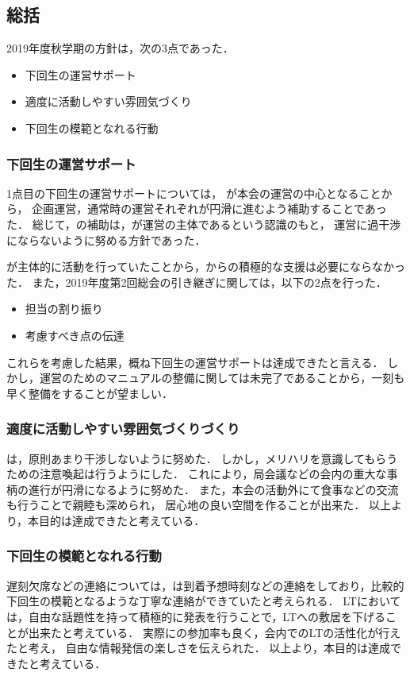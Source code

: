 \subsection*{\thirdGrade{}総括}


2019年度秋学期の\thirdGrade{}方針は，次の3点であった．
\begin {itemize}
	\item 下回生の運営サポート
	\item 適度に活動しやすい雰囲気づくり
    \item 下回生の模範となれる行動
\end {itemize}

\subsubsection*{下回生の運営サポート}

1点目の下回生の運営サポートについては，
\secondGrade{}が本会の運営の中心となることから，
企画運営，通常時の運営それぞれが円滑に進むよう補助することであった．
総じて，\thirdGrade{}の補助は，\secondGrade{}が運営の主体であるという認識のもと，
運営に過干渉にならないように努める方針であった．

\secondGrade{}が主体的に活動を行っていたことから，\thirdGrade{}からの積極的な支援は必要にならなかった．
また，2019年度第2回総会の引き継ぎに関しては，以下の2点を行った．

\begin {itemize}
	\item 担当の割り振り
	\item 考慮すべき点の伝達
\end {itemize}

これらを考慮した結果，概ね下回生の運営サポートは達成できたと言える．
しかし，運営のためのマニュアルの整備に関しては未完了であることから，一刻も早く整備をすることが望ましい．

\subsubsection*{適度に活動しやすい雰囲気づくりづくり}
\thirdGrade{}は，原則あまり干渉しないように努めた．
しかし，メリハリを意識してもらうための注意喚起は行うようにした．
これにより，局会議などの会内の重大な事柄の進行が円滑になるように努めた．
また，本会の活動外にて食事などの交流も行うことで親睦も深められ，
居心地の良い空間を作ることが出来た．
以上より，本目的は達成できたと考えている．

\subsubsection*{下回生の模範となれる行動}
遅刻欠席などの連絡については，\thirdGrade{}は到着予想時刻などの連絡をしており，比較的下回生の模範となるような丁寧な連絡ができていたと考えられる．
LTにおいては，自由な話題性を持って積極的に発表を行うことで，LTへの敷居を下げることが出来たと考えている．
実際に\firstGrade{}の参加率も良く，会内でのLTの活性化が行えたと考え，
自由な情報発信の楽しさを伝えられた．
以上より，本目的は達成できたと考えている．
